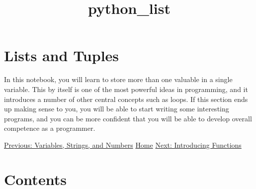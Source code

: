 \documentclass[11pt]{article}
\title{python\_list}
\begin{document}
    
    \maketitle
    
    

    
    \hypertarget{lists-and-tuples}{%
\section{Lists and Tuples}\label{lists-and-tuples}}

In this notebook, you will learn to store more than one valuable in a
single variable. This by itself is one of the most powerful ideas in
programming, and it introduces a number of other central concepts such
as loops. If this section ends up making sense to you, you will be able
to start writing some interesting programs, and you can be more
confident that you will be able to develop overall competence as a
programmer.

    \href{http://nbviewer.ipython.org/urls/raw.github.com/ehmatthes/intro_programming/master/notebooks/var_string_num.ipynb}{Previous:
Variables, Strings, and Numbers} \textbar{}
\href{http://nbviewer.ipython.org/urls/raw.github.com/ehmatthes/intro_programming/master/notebooks/index.ipynb}{Home}
\textbar{}
\href{http://nbviewer.ipython.org/urls/raw.github.com/ehmatthes/intro_programming/master/notebooks/introducing_functions.ipynb}{Next:
Introducing Functions}

    \hypertarget{contents}{%
\section{Contents}\label{contents}}
\end{document}
